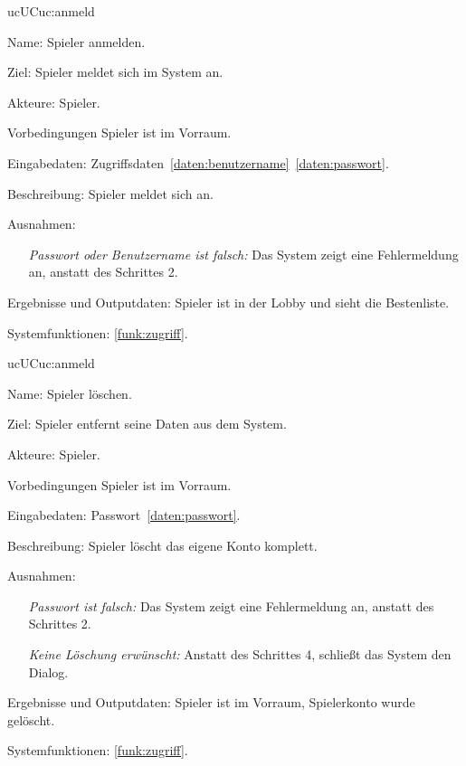 \begin{description}[leftmargin=5em, style=sameline]
	\begin{lhp}{uc}{UC}{uc:anmeld}
		\item [Name:] Spieler anmelden.
		\item [Ziel:] Spieler meldet sich im System an.
		\item [Akteure:] Spieler.
		\item [Vorbedingungen] Spieler ist im Vorraum.
		\item [Eingabedaten:] Zugriffsdaten~\ref{daten:benutzername}~\ref{daten:passwort}.
		\item [Beschreibung:] Spieler meldet sich an.							
		\item [Ausnahmen:] \hfill
			\begin{itemize} 
				\item[] \textit{Passwort oder Benutzername ist falsch:} Das System zeigt eine Fehlermeldung an, anstatt des Schrittes 2.
				
			\end{itemize}
		\item [Ergebnisse und Outputdaten:] Spieler ist in der Lobby und sieht die Bestenliste.	
		\item [Systemfunktionen:] \ref{funk:zugriff}.
	\end{lhp}
	
	\begin{lhp}{uc}{UC}{uc:anmeld}
		\item [Name:] Spieler löschen.
		\item [Ziel:] Spieler entfernt seine Daten aus dem System.
		\item [Akteure:] Spieler.
		\item [Vorbedingungen] Spieler ist im Vorraum.
		\item [Eingabedaten:] Passwort~\ref{daten:passwort}.
		\item [Beschreibung:] Spieler löscht das eigene Konto komplett.
		\item [Ausnahmen:] \hfill
			\begin{itemize} 
				\item[] \textit{Passwort ist falsch:} Das System zeigt eine Fehlermeldung an, anstatt des Schrittes 2.
				\item[] \textit{Keine Löschung erwünscht:} Anstatt des Schrittes 4, schließt das System den Dialog.
				
			\end{itemize}
		\item [Ergebnisse und Outputdaten:] Spieler ist im Vorraum, Spielerkonto wurde gelöscht.	
		\item [Systemfunktionen:] \ref{funk:zugriff}.
	\end{lhp}

\end{description}